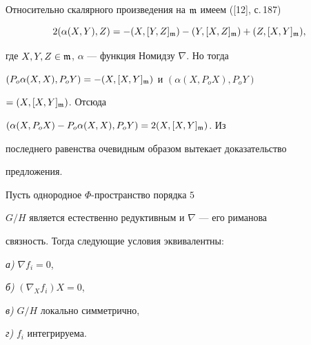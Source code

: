 \begin{pf}


Относительно скалярного произведения на $\frak{m}$ имеем ([12], с.\,187)


$$


2(\alpha(X,Y),Z)=-(X,[Y,Z]_{\frak{m}})-


(Y,[X,Z]_{\frak{m}})+(Z,[X,Y]_{\frak{m}}),


$$


где $X,Y,Z \in \frak{m}$, $\alpha$ --- функция Номидзу $\nabla$. Но тогда


$(P_o\alpha(X,X),P_oY)=-(X,[X,Y]_{\frak{m}})$ и $(\alpha(X,P_oX),P_oY)$


$=(X,[X,Y]_{\frak{m}})$. Отсюда


$(\alpha(X,P_oX)-P_o\alpha(X,X),P_oY)=2(X,[X,Y]_{\frak{m}})$. Из


последнего равенства очевидным образом вытекает доказательство


предложения.


\end{pf}





\begin{thm}


Пусть однородное $\Phi$-пространство порядка $5$


$G/H$ является естественно редуктивным и $\nabla$ --- его риманова


связность. Тогда следующие условия эквивалентны\/$:$





{\em а)} $\nabla f_i =0$,





{\em б)} $(\nabla_Xf_i)X=0$,





{\em в)} $G/H$ локально симметрично,





{\em г)} $f_i$ интегрируема.


\end{thm}





